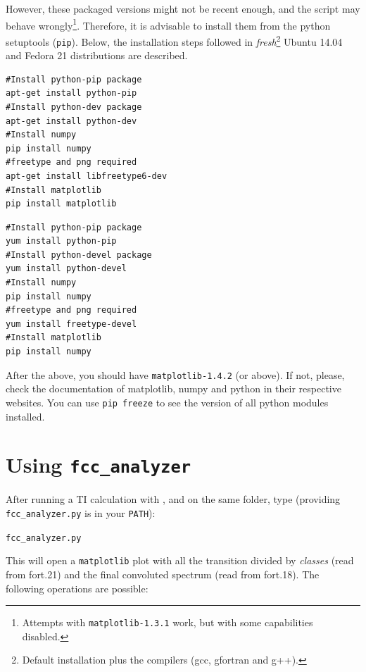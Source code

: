 \documentclass[a4paper,11pt]{article}
\begin{document}
However, these packaged versions might not be recent enough, and the script may behave wrongly\footnote{Attempts with \texttt{matplotlib-1.3.1} work, but with some capabilities disabled.}. Therefore, it is advisable to install them from the python setuptools (\texttt{pip}). Below, the installation steps followed in \textit{fresh}\footnote{Default installation plus the compilers (gcc, gfortran and g++).} Ubuntu 14.04 and Fedora 21 distributions are described.

\begin{minipage}{0.46\textwidth}
 \begin{lstlisting}[label=ubuntu_install,caption=Installing \texttt{matplotlib} in Ubuntu 14.04.]
#Install python-pip package
apt-get install python-pip
#Install python-dev package
apt-get install python-dev
#Install numpy
pip install numpy
#freetype and png required
apt-get install libfreetype6-dev
#Install matplotlib
pip install matplotlib
 \end{lstlisting}
\end{minipage}
\hspace*{0.1cm}
\begin{minipage}{0.46\textwidth}
  \begin{lstlisting}[label=fedora_install,caption=Installing \texttt{matplotlib} in Fedora 21.]
#Install python-pip package
yum install python-pip
#Install python-devel package
yum install python-devel
#Install numpy
pip install numpy
#freetype and png required
yum install freetype-devel
#Install matplotlib
pip install numpy
 \end{lstlisting}
\end{minipage}

After the above, you should have \texttt{matplotlib-1.4.2} (or above). If not, please, check the documentation of matplotlib, numpy and python in their respective websites. You can use \texttt{pip freeze} to see the version of all python modules installed.

\section{Using \texttt{fcc\_analyzer}}
After running a TI calculation with \fcc, and on the same folder, type (providing \texttt{fcc\_analyzer.py} is in your \texttt{PATH}):
\vspace*{0.2cm}

\texttt{fcc\_analyzer.py}
\vspace*{0.2cm}

\noindent This will open a \texttt{matplotlib} plot with all the transition divided by \textit{classes} (read from fort.21) and the final convoluted spectrum (read from fort.18). The following operations are possible:
\end{document}
